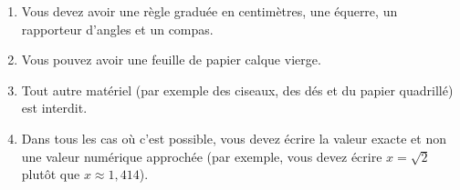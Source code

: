 {\begin{enumerate}
            \item Vous devez avoir une règle graduée en centimètres, une équerre, un rapporteur d'angles et un compas.
            \item Vous pouvez avoir une feuille de papier calque vierge.
            \item Tout autre matériel (par exemple des ciseaux, des dés et du papier quadrillé) est interdit.
            \item Dans tous les cas où c'est possible, vous devez écrire la valeur exacte et non une valeur numérique approchée (par exemple, vous devez écrire $x=\sqrt{2}$ plutôt que  $x\approx 1,414$).
	\end{enumerate}
	}


\documentclass[verso]{examenGS}



